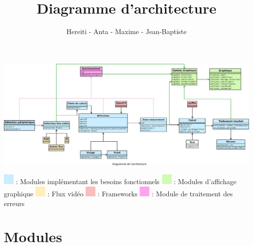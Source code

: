 \documentclass[12pt,a4paper]{article}
\title{Diagramme d'architecture}
\author{Hereiti \bsc{Hatitio} - Anta \bsc{Mbaye} - Maxime \bsc{Vincent} - Jean-Baptiste \bsc{Rey}}
\begin{document}
\maketitle

\newpage
\vspace*{-1.6in}
\vspace*{-\the\hoffset}
\thispagestyle{empty}
\includegraphics[scale=0.4,angle=90]{archi2.jpeg}
\begin{center}

\end{center}
\vspace*{-1in}
\vspace*{-\the\hoffset}
\includegraphics[scale=0.5]{bleu.png} : Modules implémentant les besoins fonctionnels\newline
\includegraphics[scale=0.5]{vert.png} : Modules d'affichage graphique\newline
\includegraphics[scale=0.5]{orange.png} : Flux vidéo\newline
\includegraphics[scale=0.5]{rouge.png} : Frameworks\newline
\includegraphics[scale=0.5]{rose.png} :  Module de traitement des erreurs

\section*{Modules}
\end{document}
